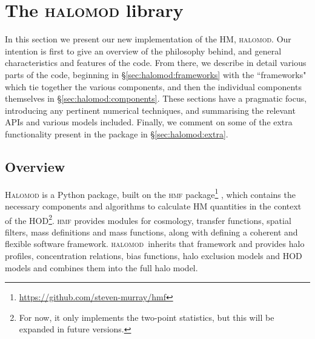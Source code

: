 \documentclass[5p]{elsarticle}
\newcommand{\halomod}{\textsc{halomod}}
\newcommand{\bd}[1]{\textcolor{purple}{\textbf{[BD: #1]}}}
\begin{document}
\section{The \textsc{halomod} library}
\label{sec:halomod}

In this section we present our new implementation of the HM, \textsc{halomod}. Our intention is first to give an overview of the philosophy behind, and general characteristics and features of the code. From there, we describe in detail various parts of the code, beginning in \S\ref{sec:halomod:frameworks} with the ``frameworks" which tie together the various components, and then the individual components themselves in \S\ref{sec:halomod:components}. These sections have a pragmatic focus, introducing any pertinent numerical techniques, and summarising the relevant APIs and  various models included. Finally, we comment on some of the extra functionality present in the package in \S\ref{sec:halomod:extra}.


 
\subsection{Overview}
\label{sec:halomod:overview}
\textsc{Halomod} is a Python package, built on the \textsc{hmf} package\footnote{\url{https://github.com/steven-murray/hmf}} \citep{Murray2013a}, which contains the necessary components and algorithms to calculate HM quantities in the context of the HOD\footnote{For now, it only implements the two-point statistics, but this will be expanded in future versions.}. 
\textsc{hmf} provides modules for cosmology, transfer functions, spatial filters, mass definitions and mass functions, along with defining a coherent and flexible software framework. 
\halomod\ inherits that framework and provides halo profiles, concentration relations, bias functions, halo exclusion models and HOD models and combines them into the full halo model.

\end{document}
